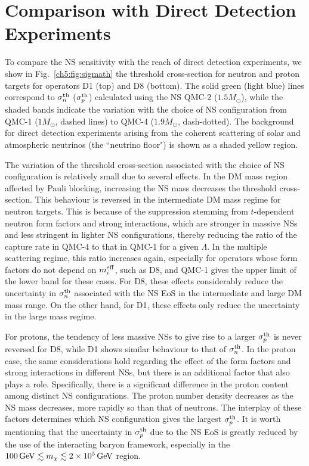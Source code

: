 \section{Comparison with Direct Detection Experiments}
\label{ch5:sec:DD_comparison}


To compare the NS sensitivity with the reach of direct detection experiments, we show in Fig.~\ref{ch5:fig:sigmath} the threshold cross-section for neutron and proton targets for operators  D1 (top) and D8 (bottom). The solid green (light blue) lines correspond to $\sigma^\mathrm{th}_n$ ($\sigma^\mathrm{th}_p$) calculated using the NS QMC-2 ($1.5 M_\odot$),  while the shaded bands indicate the variation with the choice of NS configuration from  QMC-1 ($1M_\odot$, dashed lines) to QMC-4 ($1.9 M_\odot$, dash-dotted). The background for direct detection experiments arising from the coherent scattering of solar and atmospheric neutrinos (the ``neutrino floor") is shown as a shaded yellow region. 

The variation of the threshold cross-section associated with the choice of NS configuration is relatively small due to several effects. In the DM mass region affected by Pauli blocking, increasing the NS mass decreases the threshold cross-section. This behaviour is reversed in the intermediate DM mass regime for neutron targets. This is because of the suppression stemming from $t$-dependent neutron form factors and strong interactions, which are stronger in massive NSs and less stringent in lighter NS configurations, thereby reducing the ratio of the capture rate in QMC-4 to that in QMC-1 for a given $\Lambda$. In the multiple scattering regime, this ratio increases again, especially for operators whose form factors do not depend on $m_i^{\rm eff}$, such as D8, and  QMC-1 gives the upper limit of the lower band for these cases. For D8, these effects considerably reduce the uncertainty in $\sigma^\mathrm{th}_n$ associated with the NS EoS in the intermediate and large DM mass range. On the other hand, for D1, these effects only reduce the uncertainty in the large mass regime. 

For protons, the tendency of less massive NSs to give rise to a larger $\sigma^\mathrm{th}_p$ is never reversed for D8, while D1 shows similar behaviour to that of $\sigma^\mathrm{th}_n$. In the proton case, the same considerations hold regarding the effect of the form factors and strong interactions in different NSs, but there is an additional factor that also plays a role. Specifically, there is a significant difference in the proton content among distinct NS configurations. The proton number density decreases as the NS mass decreases, more rapidly so than that of neutrons. The interplay of these factors determines which NS configuration gives the largest $\sigma^\mathrm{th}_p$. It is worth mentioning that the uncertainty in $\sigma^\mathrm{th}_p$ due to the NS EoS is greatly reduced by the use of the interacting baryon framework, especially in the $100{\rm \,GeV}\lesssim m_\chi\lesssim2\times10^5{\rm \,GeV}$ region. 



